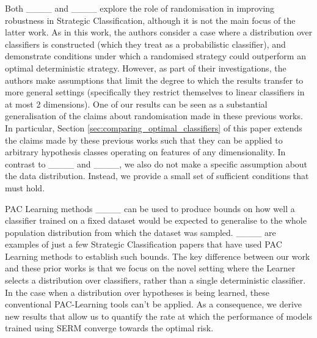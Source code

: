 Both ____ and ____ explore the role of randomisation in improving robustness in Strategic Classification, although it is not the main focus of the latter work. As in this work, the authors consider a case where a distribution over classifiers is constructed (which they treat as a probabilistic classifier), and demonstrate conditions under which a randomised strategy could outperform an optimal deterministic strategy. However, as part of their investigations, the authors make assumptions that limit the degree to which the results transfer to more general settings (specifically they restrict themselves to linear classifiers in at most 2 dimensions). One of our results can be seen as a substantial generalisation of the claims about randomisation made in these previous works. In particular, Section \ref{sec:comparing_optimal_classifiers} of this paper extends the claims made by these previous works such that they can be applied to arbitrary hypothesis classes operating on features of any dimensionality. In contrast to ____ and ____, we also do not make a specific assumption about the data distribution. Instead, we provide a small set of sufficient conditions that must hold.

PAC Learning methods ____ can be used to produce bounds on how well a classifier trained on a fixed dataset would be expected to generalise to the whole population distribution from which the dataset was sampled. ____ are examples of just a few Strategic Classification papers that have used PAC Learning methods to establish such bounds. The key difference between our work and these prior works is that we focus on the novel setting where the Learner selects a distribution over classifiers, rather than a single deterministic classifier. In the case when a distribution over hypotheses is being learned, these conventional PAC-Learning tools can't be applied. As a consequence, we derive new results that allow us to quantify the rate at which the performance of models trained using SERM converge towards the optimal risk.